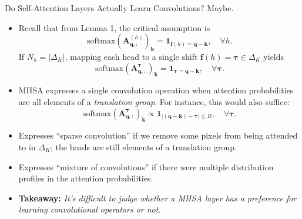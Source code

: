 \documentclass[9pt]{beamer}
\newcommand{\abs}[1]{\left\vert#1\right\vert}
\newcommand{\mb}{\bm}
\begin{document}
\begin{frame}{Do Self-Attention Layers Actually Learn Convolutions? Maybe.}
\begin{itemize}
\item Recall that from Lemma 1, the critical assumption is
\begin{equation*}
    \mathrm{softmax}(\mb A^{(h)}_{\mb q,:})_{\mb k} 
        = \bm 1_{\bm f(h) = \bm q - \bm k}, 
        \quad \forall h.
\end{equation*}
If $N_h=\abs{\Delta_K}$, mapping each head to a single shift $\bm f(h)=\bm\tau\in\Delta_K$ yields 
\begin{equation*}
    \mathrm{softmax}(\mb A^{\bm\tau}_{\mb q,:})_{\mb k} 
        = \bm 1_{\bm \tau = \bm q - \bm k}, 
        \quad \forall \bm\tau.
\end{equation*}

\item MHSA expresses a single convolution operation when attention probabilities are all elements of a {\em translation group}. For instance, this would also suffice:
\begin{equation*}
    \mathrm{softmax}(\mb A^{\bm\tau}_{\mb q,:})_{\mb k} 
        \propto \bm 1_{\abs{(\bm q - \bm k)-\bm \tau}\leq R},
        \quad \forall \bm\tau.
\end{equation*}

\item Expresses ``sparse convolution'' if we remove some pixels from being attended to in $\Delta_K$; the heads are still elements of a translation group.

\item Expresses ``mixture of convolutions'' if there were multiple distribution profiles in the attention probabilities.

\item \textbf{Takeaway:} \emph{It's difficult to judge whether a MHSA layer has a preference for learning convolutional operators or not.}
\end{itemize}
\end{frame}
\end{document}
